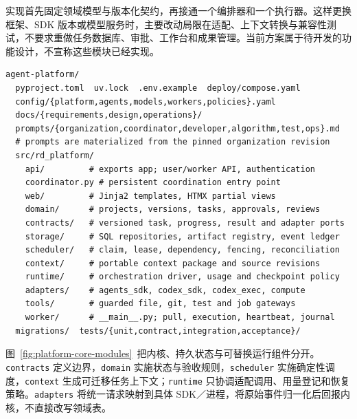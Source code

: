 \documentclass[11pt,a4paper]{article}
\begin{document}
实现首先固定领域模型与版本化契约，再接通一个编排器和一个执行器。这样更换框架、SDK 版本或模型服务时，主要改动局限在适配、上下文转换与兼容性测试，不要求重做任务数据库、审批、工作台和成果管理。当前方案属于待开发的功能设计，不宣称这些模块已经实现。

\noindent\begin{minipage}{\linewidth}
\begin{lstlisting}[caption={平台仓库拟定结构；属于实施目标，尚非已建程序}]
agent-platform/
  pyproject.toml  uv.lock  .env.example  deploy/compose.yaml
  config/{platform,agents,models,workers,policies}.yaml
  docs/{requirements,design,operations}/
  prompts/{organization,coordinator,developer,algorithm,test,ops}.md
  # prompts are materialized from the pinned organization revision
  src/rd_platform/
    api/         # exports app; user/worker API, authentication
    coordinator.py # persistent coordination entry point
    web/         # Jinja2 templates, HTMX partial views
    domain/      # projects, versions, tasks, approvals, reviews
    contracts/   # versioned task, progress, result and adapter ports
    storage/     # SQL repositories, artifact registry, event ledger
    scheduler/   # claim, lease, dependency, fencing, reconciliation
    context/     # portable context package and source revisions
    runtime/     # orchestration driver, usage and checkpoint policy
    adapters/    # agents_sdk, codex_sdk, codex_exec, compute
    tools/       # guarded file, git, test and job gateways
    worker/      # __main__.py; pull, execution, heartbeat, journal
  migrations/  tests/{unit,contract,integration,acceptance}/
\end{lstlisting}
\end{minipage}


图~\ref{fig:platform-core-modules}~把内核、持久状态与可替换运行组件分开。\texttt{contracts} 定义边界，\texttt{domain} 实施状态与验收规则，\texttt{scheduler} 实施确定性调度，\texttt{context} 生成可迁移任务上下文；\texttt{runtime} 只协调适配调用、用量登记和恢复策略。\texttt{adapters} 将统一请求映射到具体 SDK／进程，将原始事件归一化后回报内核，不直接改写领域表。
\end{document}
